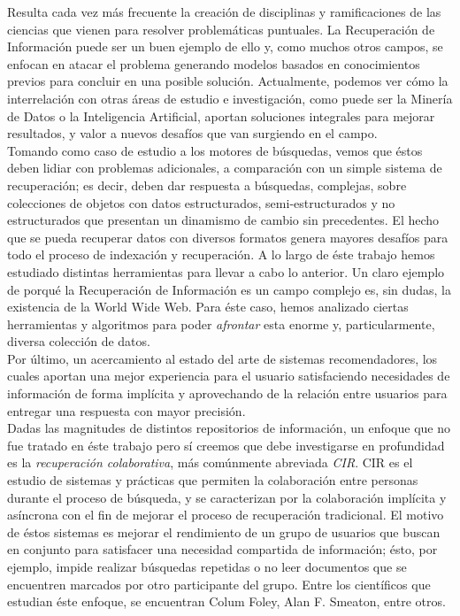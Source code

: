 Resulta cada vez más frecuente la creación de disciplinas y ramificaciones de las ciencias que vienen para resolver problemáticas puntuales. La Recuperación de Información puede ser un buen ejemplo de ello y, como muchos otros campos, se enfocan en atacar el problema generando modelos basados en conocimientos previos para concluir en una posible solución. Actualmente, podemos ver cómo la interrelación con otras áreas de estudio e investigación, como puede ser la Minería de Datos o la Inteligencia Artificial, aportan soluciones integrales para mejorar resultados, y valor a nuevos desafíos que van surgiendo en el campo. \\

Tomando como caso de estudio a los motores de búsquedas, vemos que éstos deben lidiar con problemas adicionales, a comparación con un simple sistema de recuperación; es decir, deben dar respuesta a búsquedas, complejas, sobre colecciones de objetos con datos estructurados, semi-estructurados y no estructurados que presentan un dinamismo de cambio sin precedentes. El hecho que se pueda recuperar datos con diversos formatos genera mayores desafíos para todo el proceso de indexación y recuperación. A lo largo de éste trabajo hemos estudiado distintas herramientas para llevar a cabo lo anterior. Un claro ejemplo de porqué la Recuperación de Información es un campo complejo es, sin dudas, la existencia de la World Wide Web. Para éste caso, hemos analizado ciertas herramientas y algoritmos para poder \textit{afrontar} esta enorme y, particularmente, diversa colección de datos. \\

Por último, un acercamiento al estado del arte de sistemas recomendadores, los cuales aportan una mejor experiencia para el usuario satisfaciendo necesidades de información de forma implícita y aprovechando de la relación entre usuarios para entregar una respuesta con mayor precisión. \\

Dadas las magnitudes de distintos repositorios de información, un enfoque que no fue tratado en éste trabajo pero sí creemos que debe investigarse en profundidad es la \textit{recuperación colaborativa}, más comúnmente abreviada \textit{CIR}. CIR es el estudio de sistemas y prácticas que permiten la colaboración entre personas durante el proceso de búsqueda, y se caracterizan por la colaboración implícita y asíncrona con el fin de mejorar el proceso de recuperación tradicional. El motivo de éstos sistemas es mejorar el rendimiento de un grupo de usuarios que buscan en conjunto para satisfacer una necesidad compartida de información; ésto, por ejemplo, impide realizar búsquedas repetidas o no leer documentos que se encuentren marcados por otro participante del grupo. Entre los científicos que estudian éste enfoque, se encuentran Colum Foley, Alan F. Smeaton, entre otros.